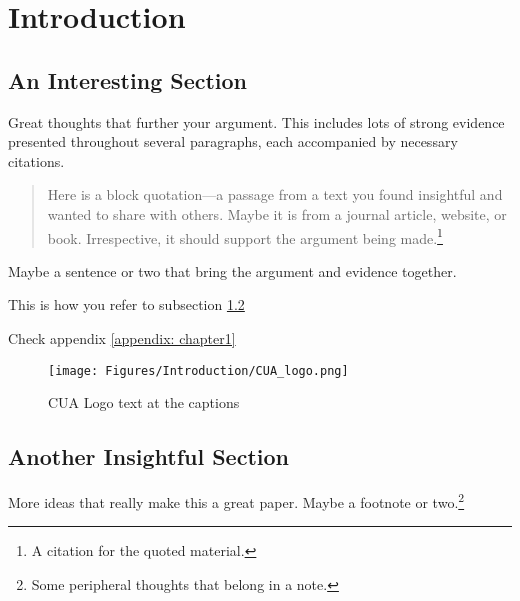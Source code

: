 \chapter{Introduction}
\label{chapter:introduction}

\section{An Interesting Section}
\label{section:interesting_section}

Great thoughts that further your argument. This includes lots of strong evidence presented throughout several paragraphs, each accompanied by necessary citations.
\begin{quotation}
    \noindent Here is a block quotation---a passage from a text you found insightful and wanted to share with others. Maybe it is from a journal article, website, or book. Irrespective, it should support the argument being made.\footnote{A citation for the quoted material.}
\end{quotation}

Maybe a sentence or two that bring the argument and evidence together.\citep{dos_santos_2020}

This is how you refer to subsection \ref{section:another_interesting_section}

Check appendix \ref{appendix: chapter1}

\begin{figure} [ht]
\centering
         \texttt{[image: Figures/Introduction/CUA\_logo.png]}
         \caption[CUA Logo text at the List of Figure]{CUA Logo text at the captions}
         \label{CUA-logo-1}
\end{figure}


\section{Another Insightful Section}
\label{section:another_interesting_section}

More ideas that really make this a great paper. Maybe a footnote or two.\footnote{Some peripheral thoughts that belong in a note.}
